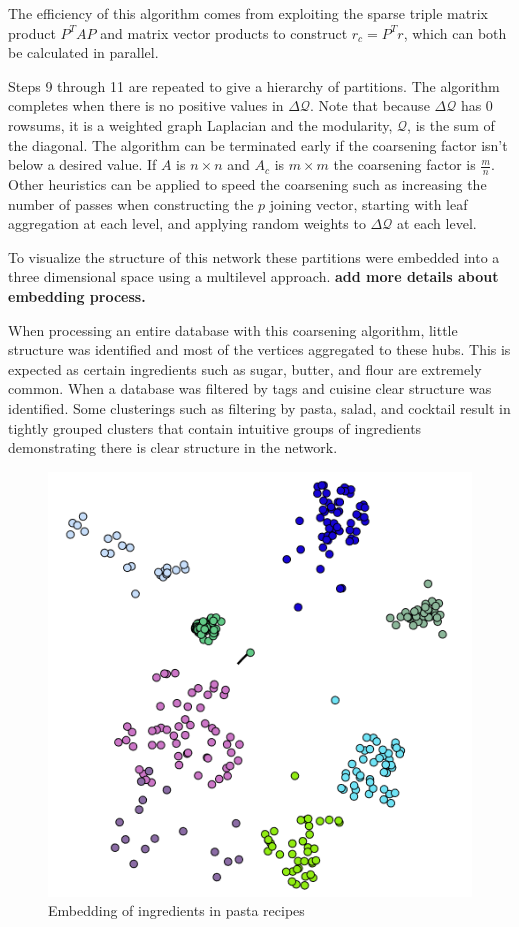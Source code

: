 \documentclass[conference]{IEEEtran}
\begin{document}
The efficiency of this algorithm comes from exploiting the sparse triple matrix
product $P^TAP$ and matrix vector products to construct $r_c = P^Tr$, which can both be calculated
in parallel.

Steps 9 through 11 are
repeated to give a hierarchy of partitions. The algorithm completes when there is no
positive values in $\Delta \mathcal{Q}$. Note that because $\Delta \mathcal{Q}$ has 0 rowsums, 
it is a weighted graph Laplacian and the modularity, $\mathcal{Q}$, is the sum of the diagonal.
The algorithm can be terminated early if the coarsening factor isn't below a desired value.
If $A$ is $n \times n$ and $A_c$ is $m \times m$ the coarsening factor is $\frac{m}{n}$.
Other heuristics can be applied to speed the coarsening such as increasing the number of passes
when constructing the $p$ joining vector, starting with leaf aggregation at each level, and
applying random weights to $\Delta \mathcal{Q}$ at each level.

To visualize the structure of this network these partitions were embedded into a three 
dimensional space using a multilevel approach. \bfseries{add more details about embedding
process.}

When processing an entire
database with this coarsening algorithm, little structure was identified and most of the vertices
aggregated to these hubs. This is expected as certain ingredients such as sugar, butter, and
flour are extremely common. When a database was filtered by tags and cuisine clear structure
was identified. Some clusterings such as filtering by pasta, salad, and cocktail result in
tightly grouped clusters that contain intuitive groups of ingredients demonstrating there is
clear structure in the network.

  \begin{figure}[h!]
	\centering
	\includegraphics[width=0.8\linewidth]{pastas.png}
	\caption[Embedding of ingredients in pasta recipes]{Embedding of ingredients in pasta recipes}
	\label{fig:P2compileP0-1}
  \end{figure}
\end{document}
